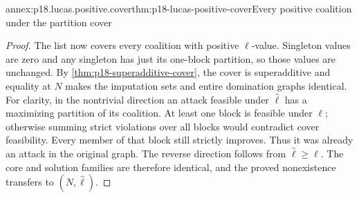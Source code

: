 \begin{annexitem}{annex:p18.lucas.positive.cover}{thm:p18-lucas-positive-cover}{Every positive coalition under the partition cover}
\begin{proof}
The list now covers every coalition with positive
\(\ell\)-value. Singleton values are zero and any singleton
has just its one-block partition, so those values are
unchanged. By \cref{thm:p18-superadditive-cover}, the cover
is superadditive and equality at \(N\) makes the imputation
sets and entire domination graphs identical.
For clarity, in the nontrivial direction an attack
feasible under \(\widehat\ell\) has a maximizing partition
of its coalition. At least one block is feasible under
\(\ell\); otherwise summing strict violations over all
blocks would contradict cover feasibility. Every member
of that block still strictly improves. Thus it was
already an attack in the original graph. The reverse
direction follows from \(\widehat\ell\geq\ell\).
The core and solution families are therefore identical,
and the proved nonexistence transfers to
\((N,\widehat\ell)\).
\end{proof}
\end{annexitem}
